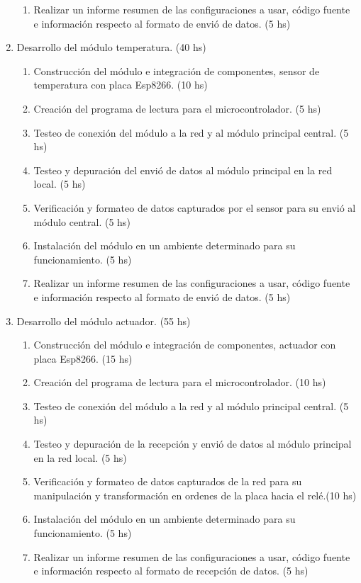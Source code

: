 \documentclass[11pt]{charter}
\begin{document}
\begin{enumerate}
\begin{enumerate}
	\item Realizar un informe resumen de las configuraciones a usar, código fuente e información respecto al formato de envió de datos. (5 hs)
	\end{enumerate}
\item Desarrollo del módulo temperatura. (40 hs)
	\begin{enumerate}
	\item Construcción del módulo e integración de componentes, sensor de temperatura con placa Esp8266. (10 hs)
	\item Creación del programa de lectura para el microcontrolador. (5 hs)
	\item Testeo de conexión del módulo a la red y al módulo principal central. (5 hs)
	\item Testeo y depuración del envió de datos al módulo principal en la red local. (5 hs)
	\item Verificación y formateo de datos capturados por el sensor para su envió al módulo central. (5 hs)
	\item Instalación del módulo en un ambiente determinado para su funcionamiento. (5 hs)
	\item Realizar un informe resumen de las configuraciones a usar, código fuente e información respecto al formato de envió de datos. (5 hs)
	\end{enumerate}
\item Desarrollo del módulo actuador. (55 hs)
	\begin{enumerate}
	\item Construcción del módulo e integración de componentes, actuador con placa Esp8266. (15 hs)
	\item Creación del programa de lectura para el microcontrolador. (10 hs)
	\item Testeo de conexión del módulo a la red y al módulo principal central. (5 hs)
	\item Testeo y depuración de la recepción y envió de datos al módulo principal en la red local. (5 hs)
	\item Verificación y formateo de datos capturados de la red para su manipulación y transformación en ordenes de la placa hacia el relé.(10 hs)
	\item Instalación del módulo en un ambiente determinado para su funcionamiento. (5 hs)
	\item Realizar un informe resumen de las configuraciones a usar, código fuente e información respecto al formato de recepción de datos. (5 hs)

\end{enumerate}
\end{enumerate}
\end{document}
